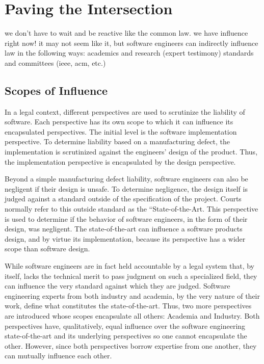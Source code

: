 \documentclass[12pt]{report}
\begin{document}
\chapter{Paving the Intersection}  
we don't have to wait and be reactive like the common law. we have influence right now! it may not seem like it, but software engineers can indirectly influence law in the following ways:  
academics and research (expert testimony)  
standards and committees (ieee, acm, etc.)  

\section{Scopes of Influence}  

In a legal context, different perspectives are used to scrutinize the liability of software. Each perspective has its own scope to which it can influence its encapsulated perspectives. The initial level is the software implementation perspective. To determine liability based on a manufacturing defect, the implementation is scrutinized against the engineers' design of the product. Thus, the implementation perspective is encapsulated by the design perspective.  

Beyond a simple manufacturing defect liability, software engineers can also be negligent if their design is unsafe. To determine negligence, the design itself is judged against a standard outside of the specification of the project. Courts normally refer to this outside standard as the ``State-of-the-Art. This perspective is used to determine if the behavior of software engineers, in the form of their design, was negligent. The state-of-the-art can influence a software products design, and by virtue its implementation, because its perspective has a wider scope than software design.  

While software engineers are in fact held accountable by a legal system that, by itself, lacks the technical merit to pass judgment on such a specialized field, they can influence the very standard against which they are judged. Software engineering experts from both industry and academia, by the very nature of their work, define what constitutes the state-of-the-art. Thus, two more perspectives are introduced whose scopes encapsulate all others: Academia and Industry. Both perspectives have, qualitatively, equal influence over the software engineering state-of-the-art and its underlying perspectives so one cannot encapsulate the other. However, since both perspectives borrow expertise from one another, they can mutually influence each other.  
\end{document}
